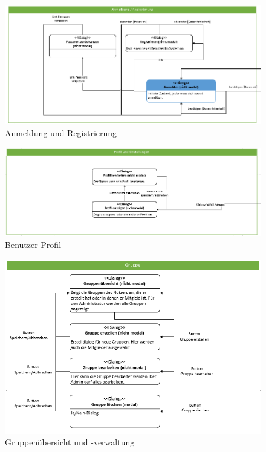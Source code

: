 \documentclass[12pt,a4paper]{article}
\begin{document}
{\begin{landscape}
\begin{figure}[H]
	\centering
	\includegraphics[width=20cm]{Bilder/Mockups/DSDAnmeldungRegistierung.png}
	\caption{Anmeldung und Registrierung}
	\label{DSDAnmeldungRegistierung}
\end{figure}

\begin{figure}[H]
	\centering
	\includegraphics[width=23cm]{Bilder/Mockups/DSDProfilUndEinstellungen.png}
	\caption{Benutzer-Profil}
	\label{DSDProfilUndEinstellungen}
\end{figure}

\begin{figure}[H]
	\centering
	\includegraphics[width=20cm]{Bilder/Mockups/DSDGruppen.png}
	\caption{Gruppenübersicht und -verwaltung}
	\label{DSDGruppen}
\end{figure}


\end{landscape}}
\end{document}
